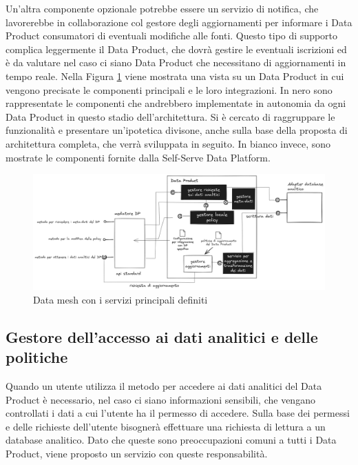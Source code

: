 \documentclass[12pt]{report}
\begin{document}
Un'altra componente opzionale potrebbe essere un servizio di notifica, che lavorerebbe in collaborazione col gestore degli aggiornamenti per informare i Data Product consumatori di eventuali modifiche alle fonti. 
Questo tipo di supporto complica leggermente il Data Product, che dovrà gestire le eventuali iscrizioni ed è da valutare nel caso ci siano Data Product che necessitano di aggiornamenti in tempo reale.
Nella Figura \ref{fig:dp supporto aggiornamenti} viene mostrata una vista su un Data Product in cui vengono precisate le componenti principali e le loro integrazioni.
In nero sono rappresentate le componenti che andrebbero implementate in autonomia da ogni Data Product in questo stadio dell'architettura.
Si è cercato di raggruppare le funzionalità e presentare un'ipotetica divisone, anche sulla base della proposta di architettura completa, che verrà sviluppata in seguito.
In bianco invece, sono mostrate le componenti fornite dalla Self-Serve Data Platform. 
\begin{figure}
    \centering
    \includegraphics[width=1\linewidth]{immagini/Data Mesh supporto agli aggiornamenti 2024-03-08 15.55.58.excalidraw.png}
    \caption{Data mesh con i servizi principali definiti}
    \label{fig:dp supporto aggiornamenti}
\end{figure}

\subsection{Gestore dell'accesso ai dati analitici e delle politiche}
Quando un utente utilizza il metodo per accedere ai dati analitici del Data Product è necessario, nel caso ci siano informazioni sensibili, che vengano controllati i dati a cui l'utente ha il permesso di accedere.
Sulla base dei permessi e delle richieste dell'utente bisognerà effettuare una richiesta di lettura a un database analitico.
Dato che queste sono preoccupazioni comuni a tutti i Data Product, viene proposto un servizio con queste responsabilità.
\end{document}
